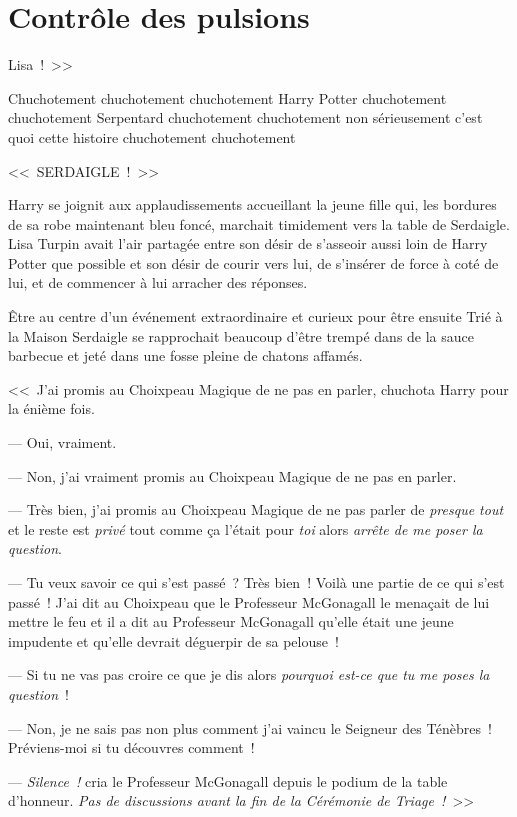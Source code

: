 \chapter{Contrôle des pulsions}

 Lisa~!~>>

\hplettrineextrapara
Chuchotement chuchotement chuchotement Harry Potter chuchotement chuchotement Serpentard chuchotement chuchotement non sérieusement c'est quoi cette histoire chuchotement chuchotement

<<~SERDAIGLE~!~>>

Harry se joignit aux applaudissements accueillant la jeune fille qui, les bordures de sa robe maintenant bleu foncé, marchait timidement vers la table de Serdaigle. Lisa Turpin avait l'air partagée entre son désir de s'asseoir aussi loin de Harry Potter que possible et son désir de courir vers lui, de s'insérer de force à coté de lui, et de commencer à lui arracher des réponses.

Être au centre d'un événement extraordinaire et curieux pour être ensuite Trié à la Maison Serdaigle se rapprochait beaucoup d'être trempé dans de la sauce barbecue et jeté dans une fosse pleine de chatons affamés.

<<~J'ai promis au Choixpeau Magique de ne pas en parler, chuchota Harry pour la énième fois.

--- Oui, vraiment.

--- Non, j'ai vraiment promis au Choixpeau Magique de ne pas en parler.

--- Très bien, j'ai promis au Choixpeau Magique de ne pas parler de \emph{presque tout} et le reste est \emph{privé} tout comme ça l'était pour \emph{toi} alors \emph{arrête de me poser la question}.

--- Tu veux savoir ce qui s'est passé~? Très bien~! Voilà une partie de ce qui s'est passé~! J'ai dit au Choixpeau que le Professeur McGonagall le menaçait de lui mettre le feu et il a dit au Professeur McGonagall qu'elle était une jeune impudente et qu'elle devrait déguerpir de sa pelouse~!

--- Si tu ne vas pas croire ce que je dis alors \emph{pourquoi est-ce que tu me poses la question}~!

--- Non, je ne sais pas non plus comment j'ai vaincu le Seigneur des Ténèbres~! Préviens-moi si tu découvres comment~!

--- \emph{Silence~!} cria le Professeur McGonagall depuis le podium de la table d'honneur. \emph{Pas de discussions avant la fin de la Cérémonie de Triage~!}~>>

